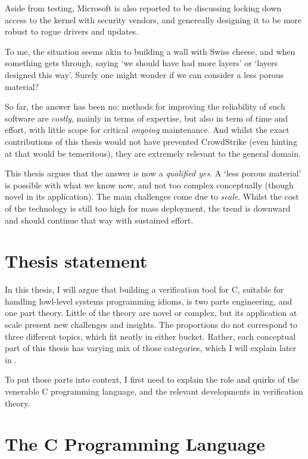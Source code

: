 Aside from testing, Microsoft is also reported to be discussing locking down
access to the kernel with security vendors, and genereally designing it to be
more robust to rogue drivers and updates.

To me, the situation seems akin to building a wall with Swiss cheese, and when
something gets through, saying `we should have had more layers' or `layers
designed this way'. Surely one might wonder if we can consider a less porous
material?

So far, the answer has been no: methods for improving the reliability of such
software are \emph{costly}, mainly in terms of expertise, but also in term of
time and effort, with little scope for critical \emph{ongoing} maintenance. And
whilst the exact contributions of this thesis would not have prevented
CrowdStrike (even hinting at that would be temeritous), they are extremely
relevant to the general domain.

This thesis argues that the answer is now a \emph{qualified yes}. A `less
porous material' is possible with what we know now, and not too complex
conceptually (though novel in its application). The main challenges come due to
\emph{scale}. Whilst the cost of the technology is still too high for mass
deployment, the trend is downward and should continue that way with sustained
effort.


\section{Thesis statement}

In this thesis, I will argue that building a verification tool for C, suitable
for handling lowl-level systems programming idioms, is two parts engineering,
and one part theory. Little of the theory are novel or complex, but its
application at scale present new challenges and insights. The proportions do
not correspond to three different topics, which fit neatly in either bucket.
Rather, each conceptual part of this thesis has varying mix of those
categories, which I will explain later in .

To put those parts into context, I first need to explain the role and quirks of
the venerable C programming language, and the relevant developments in
verification theory.

\section{The C Programming Language}

